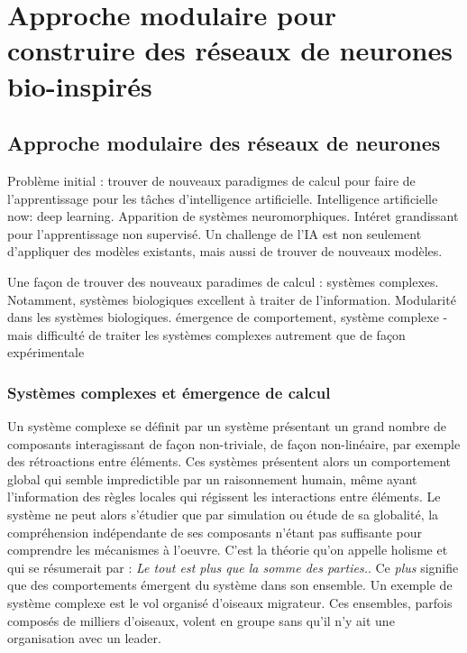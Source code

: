 \part{Approche modulaire pour construire des réseaux de neurones bio-inspirés}
\chapter{Approche modulaire des réseaux de neurones}
\graphicspath{{01-Modularite/}}
\minitoc


Problème initial : trouver de nouveaux paradigmes de calcul pour faire de l'apprentissage pour les tâches d'intelligence artificielle.
Intelligence artificielle now: deep learning. 
Apparition de systèmes neuromorphiques. Intéret grandissant pour l'apprentissage non supervisé. Un challenge de l'IA est non seulement d'appliquer des modèles existants, mais aussi de trouver de nouveaux modèles. 

Une façon de trouver des nouveaux paradimes de calcul : systèmes complexes.
Notamment, systèmes biologiques excellent à traiter de l'information. Modularité dans les systèmes biologiques.
émergence de comportement, système complexe - mais difficulté de traiter les systèmes complexes autrement que de façon expérimentale



\section{Systèmes complexes et émergence de calcul}

Un système complexe se définit par un système présentant un grand nombre de composants interagissant de façon non-triviale, de façon non-linéaire, par exemple des rétroactions entre éléments. Ces systèmes présentent alors un comportement global qui semble impredictible par un raisonnement humain, même ayant l'information des règles locales qui régissent les interactions entre éléments. Le système ne peut alors s'étudier que par simulation ou étude de sa globalité, la compréhension indépendante de ses composants n'étant pas suffisante pour comprendre les mécanismes à l'oeuvre. C'est la théorie qu'on appelle holisme et qui se résumerait par : \emph{Le tout est plus que la somme des parties.}. Ce \emph{plus} signifie que des comportements émergent du système dans son ensemble. Un exemple de système complexe  est le vol organisé d'oiseaux migrateur. Ces ensembles, parfois composés de milliers d'oiseaux, volent en groupe sans qu'il n'y ait une organisation avec un leader.

